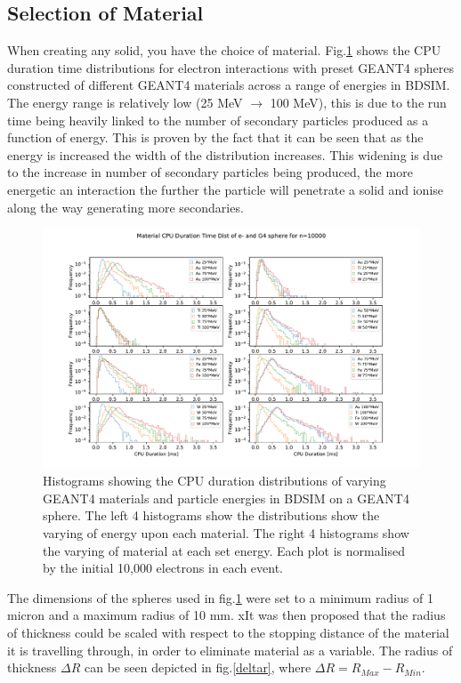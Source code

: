 \documentclass[12pt,a4paper]{article}
\begin{document}
\subsection{Selection of Material}
When creating any solid, you have the choice of material. Fig.\ref{novar} shows the CPU duration time distributions for electron interactions with preset GEANT4 spheres constructed of different GEANT4 materials across a range of energies in BDSIM. The energy range is relatively low (25 MeV $\rightarrow$ 100 MeV), this is due to the run time being heavily linked to the number of secondary particles produced as a function of energy. This is proven by the fact that it can be seen that as the energy is increased the width of the distribution increases. This widening is due to the increase in number of secondary particles being produced, the more energetic an interaction the further the particle will penetrate a solid and ionise along the way generating more secondaries.
\begin{figure}[h!]
\centering
\includegraphics[scale=0.6]{Images//Materials//not_Varied_by_radius_and_secondaries.pdf}
\caption[width=\columnwidth]{Histograms showing the CPU duration distributions of varying GEANT4 materials and particle energies in BDSIM on a GEANT4 sphere. The left 4 histograms show the distributions show the varying of energy upon each material. The right 4 histograms show the varying of material at each set energy. Each plot is normalised by the initial 10,000 electrons in each event.}
\label{novar}
\end{figure}
\newpage
\noindent The dimensions of the spheres used in fig.\ref{novar} were set to a minimum radius of 1 micron and a maximum radius of 10 mm. xIt was then proposed that the radius of thickness could be scaled with respect to the stopping distance of the material it is travelling through, in order to eliminate material as a variable. The radius of thickness $\Delta R$ can be seen depicted in fig.\ref{deltar}, where $\Delta R = R_{Max} - R_{Min}$.
\end{document}
